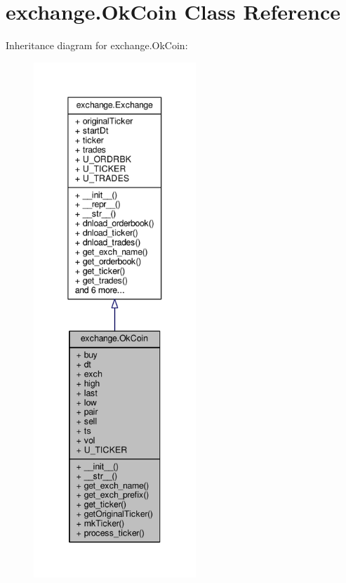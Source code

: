 \hypertarget{classexchange_1_1_ok_coin}{}\section{exchange.\+Ok\+Coin Class Reference}
\label{classexchange_1_1_ok_coin}


Inheritance diagram for exchange.\+Ok\+Coin\+:
\nopagebreak
\begin{figure}[H]
\begin{center}
\leavevmode
\includegraphics[height=550pt]{classexchange_1_1_ok_coin__inherit__graph}
\end{center}
\end{figure}



